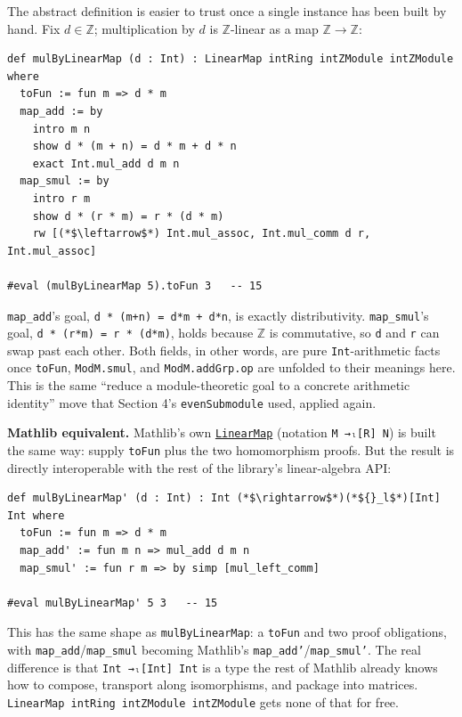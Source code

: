 The abstract definition is easier to trust once a single instance has been built by hand. Fix \(d \in \mathbb{Z}\); multiplication by \(d\) is \(\mathbb{Z}\)-linear as a map \(\mathbb{Z} \to \mathbb{Z}\):

\begin{lstlisting}
def mulByLinearMap (d : Int) : LinearMap intRing intZModule intZModule where
  toFun := fun m => d * m
  map_add := by
    intro m n
    show d * (m + n) = d * m + d * n
    exact Int.mul_add d m n
  map_smul := by
    intro r m
    show d * (r * m) = r * (d * m)
    rw [(*$\leftarrow$*) Int.mul_assoc, Int.mul_comm d r, Int.mul_assoc]

#eval (mulByLinearMap 5).toFun 3   -- 15
\end{lstlisting}

\texttt{map\_\allowbreak{}add}'s goal, \texttt{d * (m+n) = d*m + d*n}, is exactly distributivity. \texttt{map\_\allowbreak{}smul}'s goal, \texttt{d * (r*m) = r * (d*m)}, holds because \(\mathbb{Z}\) is commutative, so \texttt{d} and \texttt{r} can swap past each other. Both fields, in other words, are pure \texttt{Int}-arithmetic facts once \texttt{toFun}, \texttt{ModM.smul}, and \texttt{ModM.addGrp.op} are unfolded to their meanings here. This is the same ``reduce a module-theoretic goal to a concrete arithmetic identity'' move that Section 4's \texttt{evenSubmodule} used, applied again.

\textbf{Mathlib equivalent.} Mathlib's own \href{https://loogle.lean-lang.org/?q=LinearMap}{\texttt{LinearMap}} (notation \texttt{M →ₗ[R] N}) is built the same way: supply \texttt{toFun} plus the two homomorphism proofs. But the result is directly interoperable with the rest of the library's linear-algebra API:

\begin{lstlisting}
def mulByLinearMap' (d : Int) : Int (*$\rightarrow$*)(*${}_l$*)[Int] Int where
  toFun := fun m => d * m
  map_add' := fun m n => mul_add d m n
  map_smul' := fun r m => by simp [mul_left_comm]

#eval mulByLinearMap' 5 3   -- 15
\end{lstlisting}

This has the same shape as \texttt{mulByLinearMap}: a \texttt{toFun} and two proof obligations, with \texttt{map\_\allowbreak{}add}/\texttt{map\_\allowbreak{}smul} becoming Mathlib's \texttt{map\_\allowbreak{}add'}/\texttt{map\_\allowbreak{}smul'}. The real difference is that \texttt{Int →ₗ[Int] Int} is a type the rest of Mathlib already knows how to compose, transport along isomorphisms, and package into matrices. \texttt{LinearMap intRing intZModule intZModule} gets none of that for free.
